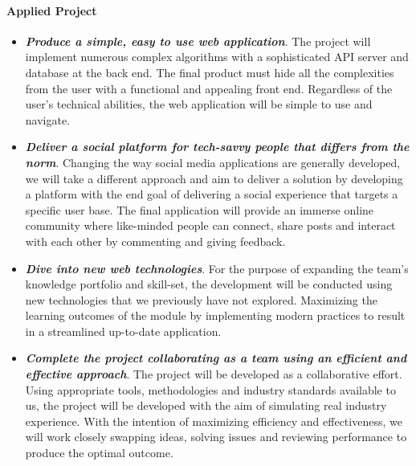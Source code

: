  \paragraph{Applied Project}
\begin{itemize}
\item \textit{\textbf{Produce a simple, easy to use web application}}. The project will implement numerous complex algorithms with a sophisticated API server and database at the back end. The final product must hide all the complexities from the user with a functional and appealing front end. Regardless of the user's technical abilities, the web application will be simple to use and navigate.
\item \textit{\textbf{Deliver a social platform for tech-savvy people that differs from the norm}}. Changing the way social media applications are generally developed, we will take a different approach and aim to deliver a solution by developing a platform with the end goal of delivering a social experience that targets a specific user base. The final application will provide an immerse online community where like-minded people can connect, share posts and interact with each other by commenting and giving feedback.
\item \textit{\textbf{Dive into new web technologies}}. For the purpose of expanding the team's knowledge portfolio and skill-set, the development will be conducted using new technologies that we previously have not explored. Maximizing the learning outcomes of the module by implementing modern practices to result in a streamlined up-to-date application.
\item \textit{\textbf{Complete the project collaborating as a team using an efficient and effective approach}}. The project will be developed as a collaborative effort. Using appropriate tools, methodologies and industry standards available to us, the project will be developed with the aim of simulating real industry experience. With the intention of maximizing efficiency and effectiveness, we will work closely swapping ideas, solving issues and reviewing performance to produce the optimal outcome.
\end{itemize}


